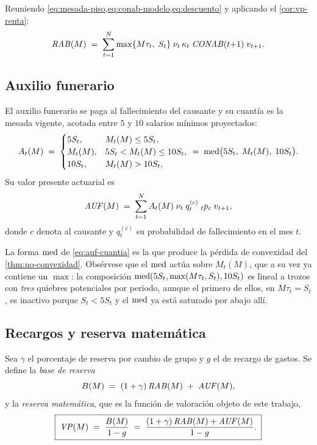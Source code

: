 Reuniendo \cref{eq:mesada-piso,eq:conab-modelo,eq:descuento} y aplicando el
\cref{cor:vp-renta}:
\begin{equation}
\label{eq:rab}
  \mathit{RAB}(M)\;=\;\sum_{t=1}^{N}\max\{M\tau_t,\;S_t\}\;\nu_t\,\kappa_t\;\mathit{CONAB}(t{+}1)\;v_{t+1}.
\end{equation}

\subsection{Auxilio funerario}

El auxilio funerario se paga al fallecimiento del causante y su cuantía es la
mesada vigente, acotada entre $5$ y $10$ salarios mínimos proyectados:
\begin{equation}
\label{eq:auf-cuantia}
  A_t(M)\;=\;
  \begin{cases}
    5S_t, & M_t(M)\le 5S_t,\\
    M_t(M), & 5S_t<M_t(M)\le 10S_t,\\
    10S_t, & M_t(M)>10S_t,
  \end{cases}
  \;=\;\operatorname{med}\bigl(5S_t,\;M_t(M),\;10S_t\bigr).
\end{equation}
Su valor presente actuarial es
\begin{equation}
\label{eq:auf}
  \mathit{AUF}(M)\;=\;\sum_{t=1}^{N} A_t(M)\;\nu_t\;q^{(c)}_t\;{}_{t}p_{c}\;v_{t+1},
\end{equation}
donde $c$ denota al causante y $q^{(c)}_t$ su probabilidad de fallecimiento en el
mes $t$.

\begin{remark}
La forma $\operatorname{med}$ de \cref{eq:auf-cuantia} es la que produce la pérdida de
convexidad del \cref{thm:no-convexidad}. Obsérvese que el $\operatorname{med}$ actúa sobre
$M_t(M)$, que a su vez ya contiene un $\max$: la composición
$\operatorname{med}(5S_t,\max(M\tau_t,S_t),10S_t)$ es lineal a trozos con \emph{tres} quiebres
potenciales por periodo, aunque el primero de ellos, en $M\tau_t=S_t$, es inactivo
porque $S_t<5S_t$ y el $\operatorname{med}$ ya está saturado por abajo allí.
\end{remark}

\subsection{Recargos y reserva matemática}

Sea $\gamma$ el porcentaje de reserva por cambio de grupo y $g$ el de recargo de
gastos. Se define la \emph{base de reserva}
\begin{equation}
\label{eq:base}
  B(M)\;=\;(1+\gamma)\,\mathit{RAB}(M)\;+\;\mathit{AUF}(M),
\end{equation}
y la \emph{reserva matemática}, que es la función de valoración objeto de este
trabajo,
\begin{equation}
\label{eq:vp}
  \boxed{\;\mathit{VP}(M)\;=\;\frac{B(M)}{1-g}\;=\;\frac{(1+\gamma)\,\mathit{RAB}(M)+\mathit{AUF}(M)}{1-g}.\;}
\end{equation}

